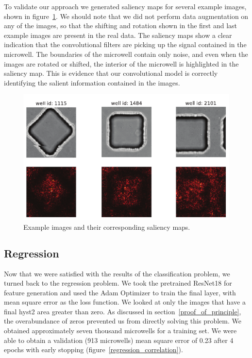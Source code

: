 \documentclass[10pt,twocolumn,letterpaper]{article}
\begin{document}
To validate our approach we generated saliency maps for several example images, shown in figure~\ref{saliency_maps}.  We should note that we did not perform data augmentation on any of the images, so that the shifting and rotation shown in the first and last example images are present in the real data.     The saliency maps show a clear indication that the convolutional filters are picking up the signal contained in the microwell.  The boundaries of the microwell contain only noise, and even when the images are rotated or shifted, the interior of the microwell is highlighted in the saliency map.  This is evidence that our convolutional model is correctly identifying the salient information contained in the images.

 \begin{figure}[b!]
\begin{center}
 \includegraphics[width=0.9\linewidth]{figures/saliency_maps.pdf}
\end{center}
   \caption{Example images and their corresponding saliency maps.}
\label{saliency_maps}
\end{figure}


\subsection{Regression}

Now that we were satisfied with the results of the classification problem, we turned back to the regression problem.  We took the pretrained ResNet18 for feature generation and used the Adam Optimizer to train the final layer, with mean square error as the loss function.  We looked at only the images that have a final hyst2 area greater than zero.  As discussed in section~\ref{proof_of_principle}, the overabundance of zeros prevented us from directly solving this problem.  We obtained approximately seven thousand microwells for a training set.  We were able to obtain a validation (913 microwells) mean square error of 0.23 after 4 epochs with early stopping (figure~\ref{regression_correlation}).
\end{document}
